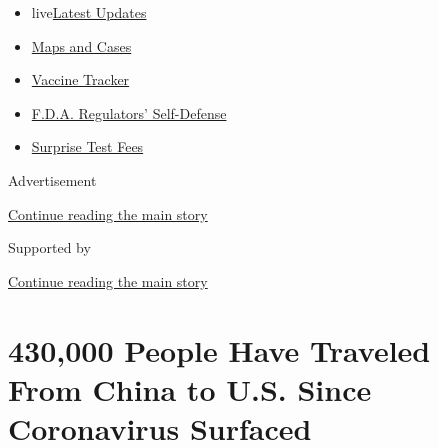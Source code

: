 \begin{itemize}
\tightlist
\item
  live\href{https://www.nytimes3xbfgragh.onion/2020/09/11/world/covid-19-coronavirus.html?name=styln-coronavirus-national\&region=TOP_BANNER\&block=storyline_menu_recirc\&action=click\&pgtype=Article\&impression_id=84f4bb21-f4c4-11ea-8094-d5ba3891c9e8\&variant=undefined}{Latest
  Updates}
\item
  \href{https://www.nytimes3xbfgragh.onion/interactive/2020/us/coronavirus-us-cases.html?name=styln-coronavirus-national\&region=TOP_BANNER\&block=storyline_menu_recirc\&action=click\&pgtype=Article\&impression_id=84f4e230-f4c4-11ea-8094-d5ba3891c9e8\&variant=undefined}{Maps
  and Cases}
\item
  \href{https://www.nytimes3xbfgragh.onion/interactive/2020/science/coronavirus-vaccine-tracker.html?name=styln-coronavirus-national\&region=TOP_BANNER\&block=storyline_menu_recirc\&action=click\&pgtype=Article\&impression_id=84f4e231-f4c4-11ea-8094-d5ba3891c9e8\&variant=undefined}{Vaccine
  Tracker}
\item
  \href{https://www.nytimes3xbfgragh.onion/2020/09/10/us/politics/fda-coronavirus-vaccine.html?name=styln-coronavirus-national\&region=TOP_BANNER\&block=storyline_menu_recirc\&action=click\&pgtype=Article\&impression_id=84f4e232-f4c4-11ea-8094-d5ba3891c9e8\&variant=undefined}{F.D.A.
  Regulators' Self-Defense}
\item
  \href{https://www.nytimes3xbfgragh.onion/2020/09/09/upshot/coronavirus-surprise-test-fees.html?name=styln-coronavirus-national\&region=TOP_BANNER\&block=storyline_menu_recirc\&action=click\&pgtype=Article\&impression_id=84f4e233-f4c4-11ea-8094-d5ba3891c9e8\&variant=undefined}{Surprise
  Test Fees}
\end{itemize}

Advertisement

\protect\hyperlink{after-top}{Continue reading the main story}

Supported by

\protect\hyperlink{after-sponsor}{Continue reading the main story}

\hypertarget{430000-people-have-traveled-from-china-to-us-since-coronavirus-surfaced}{%
\section{430,000 People Have Traveled From China to U.S. Since
Coronavirus
Surfaced}\label{430000-people-have-traveled-from-china-to-us-since-coronavirus-surfaced}}

